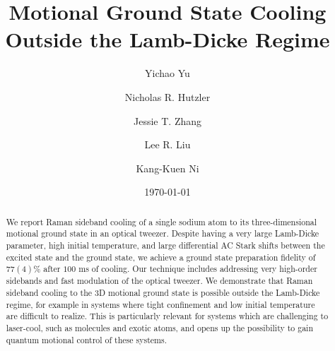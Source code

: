 \documentclass[aps,prl,twocolumn,groupedaddress]{revtex4-1}
\begin{document}
\title{Motional Ground State Cooling Outside the Lamb-Dicke Regime}
\author{Yichao Yu}
\author{Nicholas R. Hutzler}
\author{Jessie T. Zhang}
\author{Lee R. Liu}
\author{Kang-Kuen Ni}

\date{\today}

\begin{abstract}
  We report Raman sideband cooling of a single sodium atom to its three-dimensional
  motional ground state in an optical tweezer.
  Despite having a very large Lamb-Dicke parameter, high initial temperature, and
  large differential AC Stark shifts between the excited state and the ground state,
  we achieve a ground state preparation fidelity of $77(4)$\% after $100$ ms of cooling.
  Our technique includes addressing very high-order sidebands and
  fast modulation of the optical tweezer.
  We demonstrate that Raman sideband cooling to the 3D motional ground state is possible
  outside the Lamb-Dicke regime, for example in
  systems where tight confinement and low initial temperature are difficult to realize.
  This is particularly relevant for systems which are challenging to laser-cool,
  such as molecules and exotic atoms,
  and opens up the possibility to gain quantum motional control of these systems.
\end{abstract}

\maketitle
\end{document}

